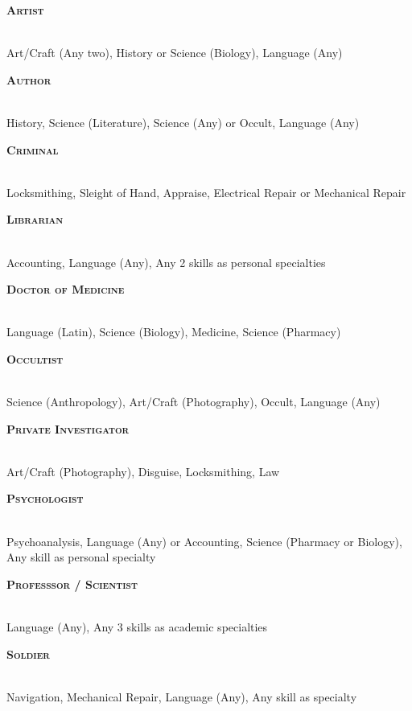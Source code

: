 

\newcommand{\makebackground}[3]{
    \noindent
    \begin{minipage}{\linewidth}
        {\raggedright\normalfont\large\bfseries\scshape #1}\\
        #3
    \end{minipage}
    \par
}
\vspace{\parskip}
\begin{multicols}{2}
    \makebackground{Artist}{}
    {Art/Craft (Any two), History or Science (Biology), Language (Any)}

    \makebackground{Author}{}
    {History, Science (Literature), Science (Any) or Occult, Language (Any)}

    \makebackground{Criminal}{}
    {Locksmithing, Sleight of Hand, Appraise, Electrical Repair or Mechanical Repair}
    
    \makebackground{Librarian}{}
    {Accounting, Language (Any), Any 2 skills as personal specialties}
    
    \makebackground{Doctor of Medicine}{}
    {Language (Latin), Science (Biology), Medicine, Science (Pharmacy)}

    \makebackground{Occultist}{}
    {Science (Anthropology), Art/Craft (Photography), Occult, Language (Any)}
   
    \makebackground{Private Investigator}{}
    {Art/Craft (Photography), Disguise, Locksmithing, Law}

    \makebackground{Psychologist}{}
    {Psychoanalysis, Language (Any) or Accounting, Science (Pharmacy or Biology), Any skill as personal specialty}

    \makebackground{Professsor / Scientist}{}
    {Language (Any), Any 3 skills as academic specialties}

    \makebackground{Soldier}{}
    {Navigation, Mechanical Repair, Language (Any), Any skill as specialty}

\end{multicols}

